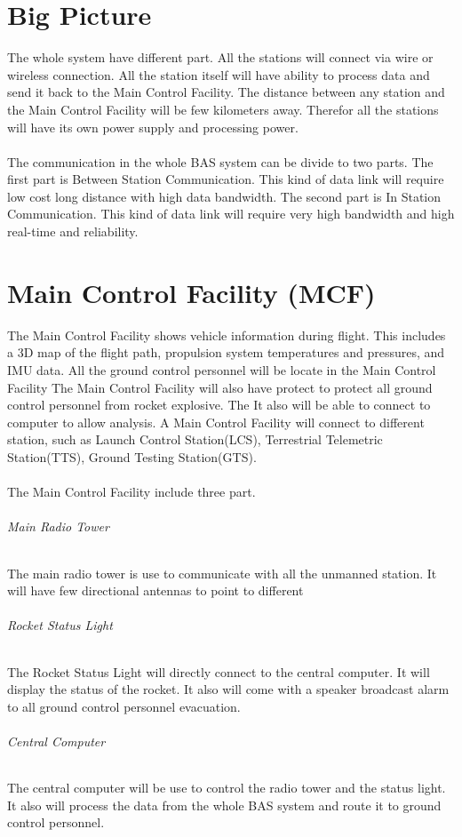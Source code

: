 \documentclass[12pt,article]{memoir}
\begin{document}
\chapter{Big Picture}
The whole system have different part. All the stations will connect via wire or wireless connection. All the station itself will have ability to process data and send it back to the Main Control Facility. The distance between any station and the Main Control Facility will be few kilometers away. Therefor all the stations will have its own power supply and processing power.\\\\
The communication in the whole BAS system can be divide to two parts. The first part is Between Station Communication. This kind of data link will require low cost long distance with high data bandwidth. The second part is In Station Communication. This kind of data link will require very high bandwidth and high real-time and reliability.
\newpage
\chapter{Main Control Facility (MCF)}
The Main Control Facility shows vehicle information during flight. This includes a 3D map of the flight path, propulsion system temperatures and pressures, and IMU data. All the ground control personnel will be locate in the Main Control Facility The Main Control Facility will also have protect to protect all ground control personnel from rocket explosive. The  It also will be able to connect to computer to allow analysis. A Main Control Facility will connect to different station, such as Launch Control Station(LCS), Terrestrial Telemetric Station(TTS), Ground Testing Station(GTS).\\\\
The Main Control Facility include three part.

\subparagraph{Main Radio Tower}
The main radio tower is use to communicate with all the unmanned station. It will have few directional antennas to point to different 
\subparagraph{Rocket Status Light}
The Rocket Status Light will directly connect to the central computer. It will display the status of the rocket. It also will come with a speaker broadcast alarm to all ground control personnel evacuation.
\subparagraph{Central Computer}
The central computer will be use to control the radio tower and the status light. It also will process the data from the whole BAS system and route it to ground control personnel.
\end{document}
